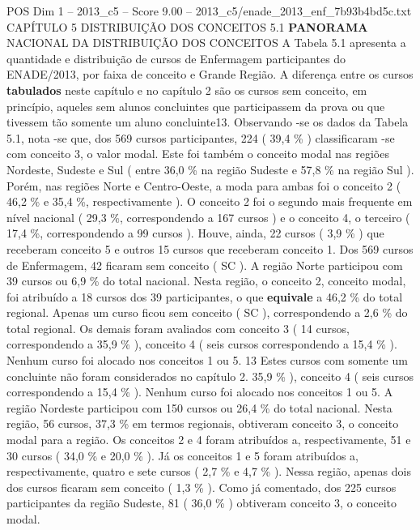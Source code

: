 \begin{textsample}{POS Dim 1 – 2013\_c5 – Score 9.00 – 2013\_c5/enade\_2013\_enf\_7b93b4bd5c.txt}  \label{ex:f1_pos_090}
CAPÍTULO 5 DISTRIBUIÇÃO DOS CONCEITOS 5.1 \textbf{PANORAMA} NACIONAL DA DISTRIBUIÇÃO DOS CONCEITOS A Tabela 5.1 apresenta a quantidade e distribuição de cursos de Enfermagem participantes do ENADE/2013, por faixa de conceito e Grande Região.
A diferença entre os cursos \textbf{tabulados} neste capítulo e no capítulo 2 são os cursos sem conceito, em princípio, aqueles sem alunos concluintes que participassem da prova ou que tivessem tão somente um aluno concluinte13.
Observando -se os dados da Tabela 5.1, nota -se que, dos 569 cursos participantes, 224 ( 39,4 \% ) classificaram -se com conceito 3, o valor modal.
Este foi também o conceito modal nas regiões Nordeste, Sudeste e Sul ( entre 36,0 \% na região Sudeste e 57,8 \% na região Sul ).
Porém, nas regiões Norte e Centro-Oeste, a moda para ambas foi o conceito 2 ( 46,2 \% e 35,4 \%, respectivamente ).
O conceito 2 foi o segundo mais frequente em nível nacional ( 29,3 \%, correspondendo a 167 cursos ) e o conceito 4, o terceiro ( 17,4 \%, correspondendo a 99 cursos ).
Houve, ainda, 22 cursos ( 3,9 \% ) que receberam conceito 5 e outros 15 cursos que receberam conceito 1.
Dos 569 cursos de Enfermagem, 42 ficaram sem conceito ( SC ).
A região Norte participou com 39 cursos ou 6,9 \% do total nacional.
Nesta região, o conceito 2, conceito modal, foi atribuído a 18 cursos dos 39 participantes, o que \textbf{equivale} a 46,2 \% do total regional.
Apenas um curso ficou sem conceito ( SC ), correspondendo a 2,6 \% do total regional.
Os demais foram avaliados com conceito 3 ( 14 cursos, correspondendo a 35,9 \% ), conceito 4 ( seis cursos correspondendo a 15,4 \% ).
Nenhum curso foi alocado nos conceitos 1 ou 5. 13 Estes cursos com somente um concluinte não foram considerados no capítulo 2. 35,9 \% ), conceito 4 ( seis cursos correspondendo a 15,4 \% ).
Nenhum curso foi alocado nos conceitos 1 ou 5.
A região Nordeste participou com 150 cursos ou 26,4 \% do total nacional.
Nesta região, 56 cursos, 37,3 \% em termos regionais, obtiveram conceito 3, o conceito modal para a região.
Os conceitos 2 e 4 foram atribuídos a, respectivamente, 51 e 30 cursos ( 34,0 \% e 20,0 \% ).
Já os conceitos 1 e 5 foram atribuídos a, respectivamente, quatro e sete cursos ( 2,7 \% e 4,7 \% ).
Nessa região, apenas dois dos cursos ficaram sem conceito ( 1,3 \% ).
Como já comentado, dos 225 cursos participantes da região Sudeste, 81 ( 36,0 \% ) obtiveram conceito 3, o conceito modal.

\end{textsample}
